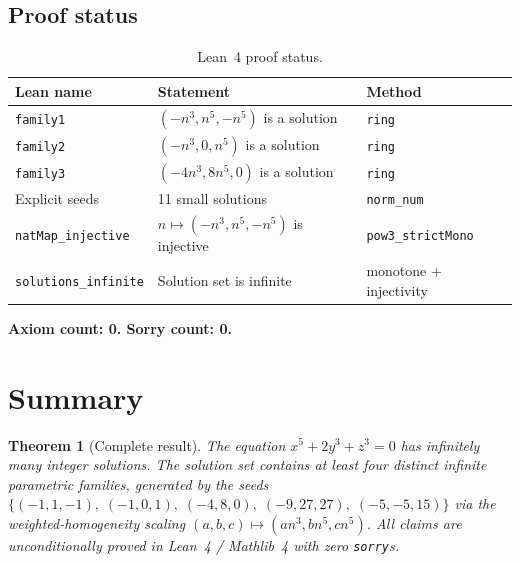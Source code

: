 \documentclass[12pt,a4paper]{article}
\newtheorem{theorem}{Theorem}[section]
\theoremstyle{definition}
\begin{document}
\subsection{Proof status}

\begin{table}[h]
\centering
\caption{Lean~4 proof status.}
\renewcommand{\arraystretch}{1.2}
\begin{tabular}{lll}
\toprule
Lean name & Statement & Method \\
\midrule
\texttt{family1} & $(-n^3, n^5, -n^5)$ is a solution & \texttt{ring} \\
\texttt{family2} & $(-n^3, 0, n^5)$ is a solution & \texttt{ring} \\
\texttt{family3} & $(-4n^3, 8n^5, 0)$ is a solution & \texttt{ring} \\
Explicit seeds & 11 small solutions & \texttt{norm\_num} \\
\texttt{natMap\_injective} & $n \mapsto (-n^3,n^5,-n^5)$ is injective & \texttt{pow3\_strictMono} \\
\texttt{solutions\_infinite} & Solution set is infinite & monotone + injectivity \\
\bottomrule
\end{tabular}
\end{table}

\textbf{Axiom count: 0. \quad Sorry count: 0.}

\section{Summary}\label{sec:summary}

\begin{theorem}[Complete result]\label{thm:complete}
  The equation $x^5 + 2y^3 + z^3 = 0$ has infinitely many integer solutions.
  The solution set contains at least four distinct infinite parametric families,
  generated by the seeds $\{(-1,1,-1),\; (-1,0,1),\; (-4,8,0),\; (-9,27,27),\;
  (-5,-5,15)\}$ via the weighted-homogeneity scaling
  $(a,b,c) \mapsto (an^3, bn^5, cn^5)$.  All claims are unconditionally proved
  in Lean~4 / Mathlib~4 with zero \texttt{sorry}s.
\end{theorem}
\end{document}
